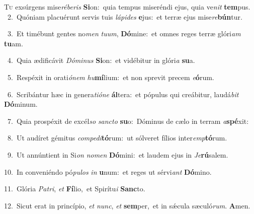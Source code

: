 \lettrine{\initial\textcolor{\initialcolor}{T}}{u} exsúrgens mise\-\textit{ré}\-\textit{be}\textit{ris} \textbf{Si}\-on:~\star quia tempus miseréndi ejus, quia ve\textit{nit} \textbf{tem}\-pus.\\
{\numbfont\textcolor{\numbcolor}{~2.}}~Quóniam placuérunt servis tuis \textit{lá}\-\textit{pi}\textit{des} \textbf{e}\-jus:~\star et terræ ejus mise\-\textit{re}\-\textbf{bún}tur.\par
{\numbfont\textcolor{\numbcolor}{~3.}}~Et timébunt gentes no\textit{men} \textit{tu}\-\textit{um}, \textbf{Dó}\-mine:~\star et omnes reges terræ glóri\textit{am} \textbf{tu}\-am.\par
{\numbfont\textcolor{\numbcolor}{~4.}}~Quia ædificávit \textit{Dó}\-\textit{mi}\textit{nus} \textbf{Si}\-on:~\star et vidébitur in glóri\textit{a} \textbf{su}\-a.\par
{\numbfont\textcolor{\numbcolor}{~5.}}~Respéxit in orati\-\textit{ó}\-\textit{nem} \textit{hu}\-\textbf{mí}lium:~\star et non sprevit precem \textit{e}\-\textbf{ó}rum.\par
{\numbfont\textcolor{\numbcolor}{~6.}}~Scribántur hæc in genera\-\textit{ti}\-\textit{ó}\textit{ne} \textbf{ál}\-tera:~\star et pópulus qui creábitur, laudá\textit{bit} \textbf{Dó}\-minum.\par
{\numbfont\textcolor{\numbcolor}{~7.}}~Quia prospéxit de excél\textit{so} \textit{sanc}\-\textit{to} \textbf{su}\-o:~\star Dóminus de cælo in terram \textit{a}\-\textbf{spé}xit:\par
{\numbfont\textcolor{\numbcolor}{~8.}}~Ut audíret gémitus \textit{com}\-\textit{pe}\textit{di}\textbf{tó}rum:~\star ut sólveret fílios inter\-\textit{emp}\-\textbf{tó}rum.\par
{\numbfont\textcolor{\numbcolor}{~9.}}~Ut annúntient in Si\textit{on} \textit{no}\-\textit{men} \textbf{Dó}\-mini:~\star et laudem ejus in \textit{Je}\-\textbf{rú}salem.\par
{\numbfont\textcolor{\numbcolor}{10.}}~In conveniéndo pó\-\textit{pu}\-\textit{los} \textit{in} \textbf{u}\-num:~\star et reges ut sérvi\textit{ant} \textbf{Dó}\-mino.\par
{\numbfont\textcolor{\numbcolor}{11.}}~Glória \textit{Pa}\-\textit{tri}, \textit{et} \textbf{Fí}\-lio,~\star et Spirítu\textit{i} \textbf{Sanc}\-to.\par
{\numbfont\textcolor{\numbcolor}{12.}}~Sicut erat in princípio, \textit{et} \textit{nunc}\-, \textit{et} \textbf{sem}\-per,~\star et in sǽcula sæculó\-\textit{rum}\-. \textbf{A}\-men.\par
